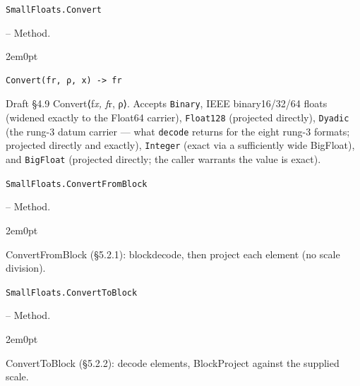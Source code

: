 \par\medskip\noindent\begin{minipage}{\linewidth}
\hypertarget{2118065800926972834}{\texttt{SmallFloats.Convert}}  -- {Method.}
\nopagebreak
\begin{adjustwidth}{2em}{0pt}


\begin{verbatim}
Convert(fr, ρ, x) -> fr
\end{verbatim}

Draft §4.9 Convert⟨f\emph{x, f}r, ρ⟩. Accepts \texttt{Binary}, IEEE binary16/32/64 floats (widened exactly to the Float64 carrier), \texttt{Float128} (projected directly), \texttt{Dyadic} (the rung-3 datum carrier — what \texttt{decode} returns for the eight rung-3 formats; projected directly and exactly), \texttt{Integer} (exact via a sufficiently wide BigFloat), and \texttt{BigFloat} (projected directly; the caller warrants the value is exact).



\end{adjustwidth}
\end{minipage}
\par\medskip

\par\medskip\noindent\begin{minipage}{\linewidth}
\hypertarget{15995489740638035986}{\texttt{SmallFloats.ConvertFromBlock}}  -- {Method.}
\nopagebreak
\begin{adjustwidth}{2em}{0pt}

ConvertFromBlock (§5.2.1): blockdecode, then project each element (no scale division).



\end{adjustwidth}
\end{minipage}
\par\medskip

\par\medskip\noindent\begin{minipage}{\linewidth}
\hypertarget{11399645714333645993}{\texttt{SmallFloats.ConvertToBlock}}  -- {Method.}
\nopagebreak
\begin{adjustwidth}{2em}{0pt}

ConvertToBlock (§5.2.2): decode elements, BlockProject against the supplied scale.



\end{adjustwidth}
\end{minipage}
\par\medskip

